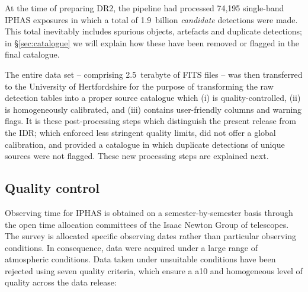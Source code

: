 \documentclass[a4paper,useAMS,usenatbib]{mn2e}
\begin{document}
{At the time of preparing DR2,
the pipeline had processed
74,195 single-band IPHAS exposures 
in which a total of 1.9~billion \emph{candidate} detections
were made.
This total inevitably includes spurious objects, artefacts and
duplicate detections;
in \S\ref{sec:catalogue} we will explain
how these have been removed or flagged in the final catalogue.

The entire data set -- comprising 2.5~terabyte of FITS files --
was then transferred to the University of Hertfordshire
for the purpose of transforming the raw
detection tables into a proper source catalogue which
(i) is quality-controlled,
(ii) is homogeneously calibrated, and 
(iii) contains user-friendly columns and warning flags.
It is these post-processing steps which distinguish the present release
from the IDR; which enforced less stringent quality limits,
did not offer a global calibration,
and provided a catalogue in which duplicate detections
of unique sources were not flagged.
These new processing steps are explained next.}


\subsection{Quality control}
\label{sec:qc}

Observing time for IPHAS is obtained
on a semester-by-semester basis
through the open time allocation committees 
of the Isaac Newton Group of telescopes.
The survey is allocated specific observing dates
rather than particular observing conditions.
In consequence, data were acquired
under a large range of atmospheric conditions.
Data taken under unsuitable conditions
have been rejected using seven quality criteria,
which ensure a a10 and homogeneous level of quality
across the data release:
\end{document}
